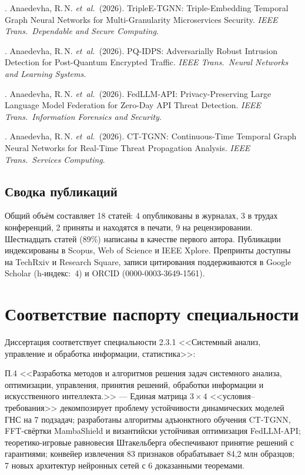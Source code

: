 . Anaedevha, R.\,N. \textit{et~al.}\ (2026). TripleE-TGNN: Triple-Embedding Temporal Graph Neural Networks for Multi-Granularity Microservices Security. \textit{IEEE Trans.\ Dependable and Secure Computing}.

. Anaedevha, R.\,N. \textit{et~al.}\ (2026). PQ-IDPS: Adversarially Robust Intrusion Detection for Post-Quantum Encrypted Traffic. \textit{IEEE Trans.\ Neural Networks and Learning Systems}.

. Anaedevha, R.\,N. \textit{et~al.}\ (2026). FedLLM-API: Privacy-Preserving Large Language Model Federation for Zero-Day API Threat Detection. \textit{IEEE Trans.\ Information Forensics and Security}.

. Anaedevha, R.\,N. \textit{et~al.}\ (2026). CT-TGNN: Continuous-Time Temporal Graph Neural Networks for Real-Time Threat Propagation Analysis. \textit{IEEE Trans.\ Services Computing}.

\subsection*{Сводка публикаций}

Общий объём составляет 18 статей: 4 опубликованы в журналах, 3 в трудах конференций, 2 приняты и находятся в печати, 9 на рецензировании. Шестнадцать статей (89\%) написаны в качестве первого автора. Публикации индексированы в Scopus, Web of Science и IEEE Xplore. Препринты доступны на TechRxiv и Research Square, записи цитирования поддерживаются в Google Scholar (h-индекс:~4) и ORCID (0000-0003-3649-1561).


\section*{Соответствие паспорту специальности}

Диссертация соответствует специальности 2.3.1 <<Системный анализ, управление и обработка информации, статистика>>:

\noindent П.4 <<Разработка методов и алгоритмов решения задач системного анализа, оптимизации, управления, принятия решений, обработки информации и искусственного интеллекта.>> --- Единая матрица $3\times4$ <<условия--требования>> декомпозирует проблему устойчивости динамических моделей ГНС на 7 подзадач; разработаны алгоритмы адъюнктного обучения CT-TGNN, FFT-свёртки MambaShield и византийски устойчивая оптимизация FedLLM-API; теоретико-игровые равновесия Штакельберга обеспечивают принятие решений с гарантиями; конвейер извлечения 83 признаков обрабатывает 84,2 млн образцов; 7 новых архитектур нейронных сетей с 6 доказанными теоремами.

